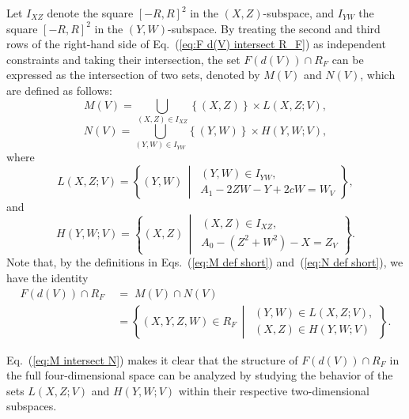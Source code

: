 \documentclass[12pt]{iopart}
\begin{document}
Let \( I_{XZ} \) denote the square \( [-R, R]^2 \) in the \( (X,Z) \)-subspace, and \( I_{YW} \) the square \( [-R, R]^2 \) in the \( (Y,W) \)-subspace. By treating the second and third rows of the right-hand side of Eq.~(\ref{eq:F d(V) intersect R_F}) as independent constraints and taking their intersection, the set \( F(d(V)) \cap R_F \) can be expressed as the intersection of two sets, denoted by \( M(V) \) and \( N(V) \), which are defined as follows:
\begin{equation}\label{eq:M def short}
M(V) = \bigcup_{(X,Z)\in I_{XZ}} \left\lbrace (X,Z) \right\rbrace \times L(X,Z;V),
\end{equation}
\begin{equation}\label{eq:N def short}
N(V) = \bigcup_{(Y,W)\in I_{YW}} \left\lbrace (Y,W) \right\rbrace \times H(Y,W;V),
\end{equation}
where
\begin{equation}\label{eq:L}
L(X,Z;V) = \left\lbrace (Y,W) \,\middle|\, 
\begin{array}{l}
(Y,W) \in I_{YW},\\
A_1 - 2ZW - Y + 2cW = W_V
\end{array} \right\rbrace,
\end{equation}
and
\begin{equation}\label{eq:H}
H(Y,W;V) = \left\lbrace (X,Z) \,\middle|\, 
\begin{array}{l}
(X,Z) \in I_{XZ},\\
A_0 - (Z^2 + W^2) - X = Z_V
\end{array} \right\rbrace.
\end{equation}
Note that, by the definitions in Eqs.~(\ref{eq:M def short}) and~(\ref{eq:N def short}), we have the identity
\begin{eqnarray}
F(d(V)) \cap R_F \;&=\; M(V) \cap N(V)\nonumber \\ 
&=\left\lbrace (X,Y,Z,W) \in R_F \,\middle|\, 
\begin{array}{l}
(Y,W) \in L(X,Z;V),\\
(X,Z) \in H(Y,W;V)
\end{array} \right\rbrace. \label{eq:M intersect N}
\end{eqnarray}

Eq.~(\ref{eq:M intersect N}) makes it clear that the structure of \( F(d(V)) \cap R_F \) in the full four-dimensional space can be analyzed by studying the behavior of the sets \( L(X,Z;V) \) and \( H(Y,W;V) \) within their respective two-dimensional subspaces.
\end{document}
